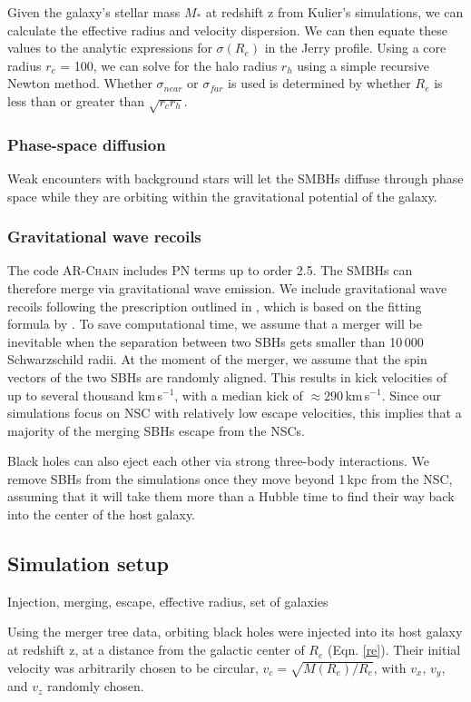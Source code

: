 \documentclass[english, apj]{emulateapj}
\begin{document}
Given the galaxy's stellar mass $M_{*}$ at redshift z from Kulier's simulations, we can calculate the effective radius and velocity dispersion.  We can then equate these values to the analytic expressions for $\sigma(R_{e})$ in the Jerry profile.  Using a core radius $r_c$ = 100, we can solve for the halo radius $r_h$ using a simple recursive Newton method.  Whether $\sigma_{near}$ or $\sigma_{far}$ is used is determined by whether $R_e$ is less than or greater than $\sqrt{r_c r_h}$.

\subsubsection{Phase-space diffusion}
Weak encounters with background stars will let the SMBHs diffuse through phase space while they are orbiting within the gravitational potential of the galaxy.

\subsubsection{Gravitational wave recoils}
The code \textsc{AR-Chain} includes PN terms up to order 2.5. The SMBHs can therefore merge via gravitational wave emission. We include gravitational wave recoils following the prescription outlined in \citet{2015ApJ...799..178K}, which is based on the fitting formula by \citet{2012PhRvD..85h4015L}. To save computational time, we assume that a merger will be inevitable when the separation between two SBHs gets smaller than 10\,000 Schwarzschild radii. At the moment of the merger, we assume that the spin vectors of the two SBHs are randomly aligned. This results in kick velocities of up to several thousand km\,s$^{-1}$, with a median kick of $\approx 290$\,km\,s$^{-1}$. Since our simulations focus on NSC with relatively low escape velocities, this implies that a majority of the merging SBHs escape from the NSCs. 

Black holes can also eject each other via strong three-body interactions. We remove SBHs from the simulations once they move beyond 1\,kpc from the NSC, assuming that it will take them more than a Hubble time to find their way back into the center of the host galaxy.


\subsection{Simulation setup}
Injection, merging, escape, effective radius, set of galaxies

Using the merger tree data, orbiting black holes were injected into its host galaxy at redshift z, at a distance from the galactic center of $R_{e}$ (Eqn. \ref{re}).  Their initial velocity was arbitrarily chosen to be circular, $v_c = \sqrt{M(R_e)/R_e}$, with $v_x$, $v_y$, and $v_z$ randomly chosen.
\end{document}
